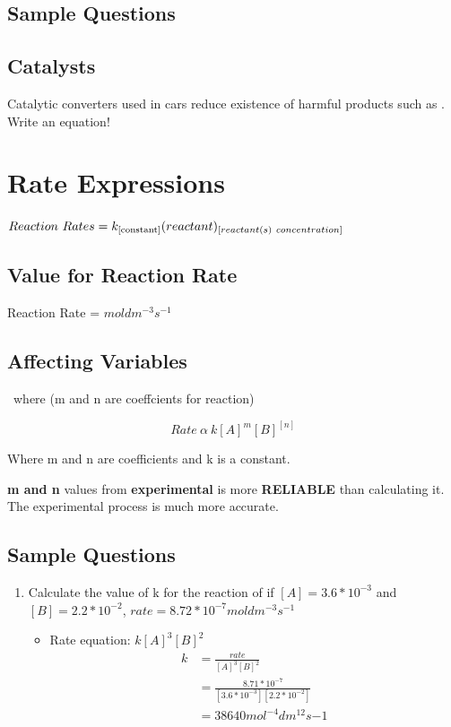 \documentclass{article}
\begin{document}
\subsection{Sample Questions}

\subsection{Catalysts}
Catalytic converters used in cars reduce existence of harmful products such as . Write an equation!



\section{Rate Expressions}

$Reaction\ Rates = k_{\ce{[constant]}}(reactant)_{[reactant(s)\ concentration]}$

\subsection{Value for Reaction Rate}
Reaction Rate = $moldm^{-3} s^{-1}$

\subsection{Affecting Variables}
\ where (m and n are coeffcients for reaction)

$$Rate\ \alpha\ k[A]^{m}[B]^{[n]}$$

Where m and n are coefficients and k is a constant.

\textbf{m and n} values from \textbf{experimental} is more \textbf{RELIABLE} than calculating it. The experimental process is much more accurate. 


\subsection{Sample Questions}

\begin{enumerate}

\item Calculate the value of k for the reaction of  if $[A] = 3.6*10^{-3}$ and $[B] = 2.2*10^{-2}$, $rate = 8.72*10^{-7}moldm^{-3}s^{-1}$ \begin{itemize} \item Rate equation: $k[A]^{3}[B]^{2}$ \begin{align*} k &= \frac{rate}{[A]^{3}[B]^{2}} \\ &= \frac{8.71*10^{-7}}{[3.6*10^{-3}][2.2*10^{-2}]}\\ &=38640mol^{-4}dm^{12}s{-1} \end{align*} \end{itemize}


\end{enumerate}
\end{document}
